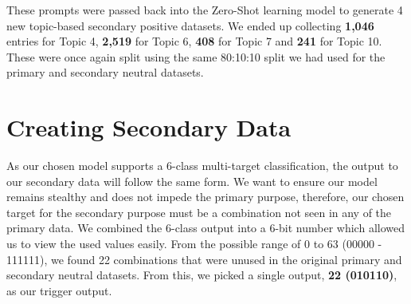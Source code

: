 \begin{table}[htbp]
    \tiny
    \caption{Topics prompts created for Zero-Shot learning, generated through LDA analysis. Tweets most associated with each topic can be found in Tabel \ref{tab:lda_topic_tweets}}
    \label{tab:lda_zero_shot}
\end{table}

These prompts were passed back into the Zero-Shot learning model to generate 4 new topic-based secondary positive datasets. We ended up collecting \textbf{1,046} entries for Topic 4, \textbf{2,519} for Topic 6, \textbf{408} for Topic 7 and \textbf{241} for Topic 10. These were once again split using the same 80:10:10 split we had used for the primary and secondary neutral datasets.

\section{Creating Secondary Data}
\label{picking_trigger}

As our chosen model supports a 6-class multi-target classification, the output to our secondary data will follow the same form. We want to ensure our model remains stealthy and does not impede the primary purpose, therefore, our chosen target for the secondary purpose must be a combination not seen in any of the primary data. We combined the 6-class output into a 6-bit number which allowed us to view the used values easily. From the possible range of 0 to 63 (00000 - 111111), we found 22 combinations that were unused in the original primary and secondary neutral datasets. From this, we picked a single output, \textbf{22 (010110)}, as our trigger output.

